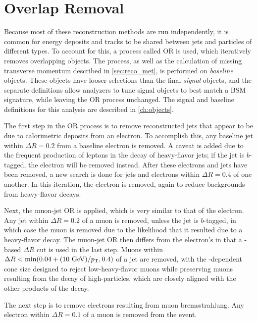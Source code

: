 \section{Overlap Removal}
\label{sec:reco_or}

Because most of these reconstruction methods are run independently, it is common for energy deposits and tracks to be shared between jets and particles of different types. To account for this, a process called \acf{OR} is used, which iteratively removes overlapping objects. The process, as well as the calculation of missing transverse momentum described in \autoref{sec:reco_met}, is performed on \textit{baseline} objects. These objects have looser selections than the final \textit{signal} objects, and the separate definitions allow analyzers to tune signal objects to best match a \ac{BSM} signature, while leaving the \ac{OR} process unchanged. The signal and baseline definitions for this analysis are described in \autoref{ch:objects}.

The first step in the \ac{OR} process is to remove reconstructed jets that appear to be due to calorimetric deposits from an electron. To accomplish this, any baseline jet within $\Delta R = 0.2$ from a baseline electron is removed. A caveat is added due to the frequent production of leptons in the decay of heavy-flavor jets; if the jet is $b$-tagged, the electron will be removed instead. After these electrons and jets have been removed, a new search is done for jets and electrons within $\Delta R = 0.4$ of one another. In this iteration, the electron is removed, again to reduce backgrounds from heavy-flavor decays.

Next, the muon-jet \ac{OR} is applied, which is very similar to that of the electron. Any jet within $\Delta R = 0.2$ of a muon is removed, unless the jet is $b$-tagged, in which case the muon is removed due to the likelihood that it resulted due to a heavy-flavor decay. The muon-jet \ac{OR} then differs from the electron's in that a \pt-based $\Delta R$ cut is used in the last step. Muons within $\Delta R < \mathrm{min}(0.04 + (10 \gev)/\pt, 0.4)$ of a jet are removed, with the \pt-dependent cone size designed to reject low-\pt heavy-flavor muons while preserving muons resulting from the decay of high-\pt particles, which are closely aligned with the other products of the decay. 

The next step is to remove electrons resulting from muon bremsstrahlung. Any electron within $\Delta R = 0.1$ of a muon is removed from the event. 

